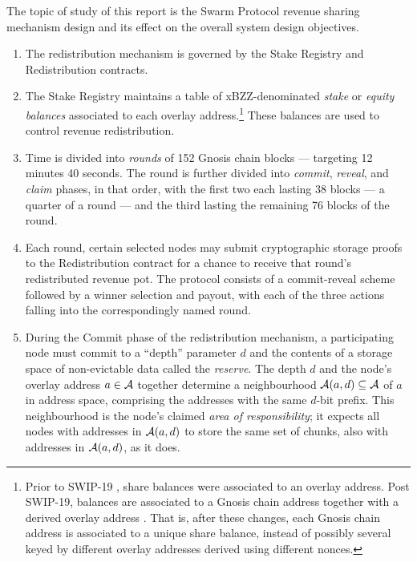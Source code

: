 The topic of study of this report is the Swarm Protocol revenue sharing mechanism design and its effect on the overall system design objectives.
%
\begin{enumerate}
  \item 
    The redistribution mechanism is governed by the Stake Registry and Redistribution contracts.
  
  \item
    The Stake Registry maintains a table of xBZZ-denominated \emph{stake} or \emph{equity balances} associated to each overlay address.\footnote{    Prior to SWIP-19 \cite{swip-19}, share balances were associated to an overlay address.
    Post SWIP-19, balances are associated to a Gnosis chain address together with a derived overlay address \cite{swip-19}.
    That is, after these changes, each Gnosis chain address is associated to a unique share balance, instead of possibly several keyed by different overlay addresses derived using different nonces.}
    These balances are used to control revenue redistribution.

  \item
    Time is divided into \emph{rounds} of 152 Gnosis chain blocks --- targeting 12 minutes 40 seconds.
    The round is further divided into \emph{commit}, \emph{reveal}, and \emph{claim} phases, in that order, with the first two each lasting 38 blocks --- a quarter of a round --- and the third lasting the remaining 76 blocks of the round.

  \item
    Each round, certain selected nodes may submit cryptographic storage proofs to the Redistribution contract for a chance to receive that round's redistributed revenue pot.
    The protocol consists of a commit-reveal scheme followed by a winner selection and payout, with each of the three actions falling into the correspondingly named round.

  \item
    During the Commit phase of the redistribution mechanism, a participating node must commit to a ``depth'' parameter $d$ and the contents of a storage space of non-evictable data called the \emph{reserve}.
    The depth $d$ and the node's overlay address $a\in\mathcal{A}$ together determine a neighbourhood $\mathcal{A}(a,d)\subseteq\mathcal{A}$ of $a$ in address space, comprising the addresses with the same $d$-bit prefix.
    This neighbourhood is the node's claimed \emph{area of responsibility}; it expects all nodes with addresses in $\mathcal{A}(a,d)$ to store the same set of chunks, also with addresses in $\mathcal{A}(a,d)$, as it does.
    

\end{enumerate}

